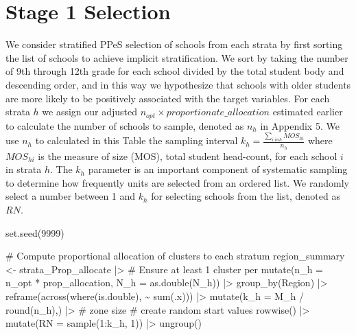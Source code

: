 \documentclass[
  12pt]{article}
\newenvironment{Shaded}{\begin{snugshade}}{\end{snugshade}}
\newcommand{\AttributeTok}[1]{\textcolor[rgb]{0.40,0.45,0.13}{#1}}
\newcommand{\CommentTok}[1]{\textcolor[rgb]{0.37,0.37,0.37}{#1}}
\newcommand{\DecValTok}[1]{\textcolor[rgb]{0.68,0.00,0.00}{#1}}
\newcommand{\FunctionTok}[1]{\textcolor[rgb]{0.28,0.35,0.67}{#1}}
\newcommand{\NormalTok}[1]{\textcolor[rgb]{0.00,0.23,0.31}{#1}}
\newcommand{\OtherTok}[1]{\textcolor[rgb]{0.00,0.23,0.31}{#1}}
\newcommand{\SpecialCharTok}[1]{\textcolor[rgb]{0.37,0.37,0.37}{#1}}
\begin{document}
\section{Stage 1 Selection}\label{stage-1-selection}

We consider stratified PPeS selection of schools from each strata by
first sorting the list of schools to achieve implicit stratification. We
sort by taking the number of 9th through 12th grade for each school
divided by the total student body and descending order, and in this way
we hypothesize that schools with older students are more likely to be
positively associated with the target variables. For each strata \(h\)
we assign our adjusted \(n_{opt} \times proportionate \_ allocation\)
estimated earlier to calculate the number of schools to sample, denoted
as \(n_h\) in Appendix 5. We use \(n_h\) to calculated in this Table the
sampling interval \(k_h = \frac{\sum_{i \ in h} MOS_{hi}}{n_h}\) where
\(MOS_{hi}\) is the measure of size (MOS), total student head-count, for
each school \(i\) in strata \(h\). The \(k_h\) parameter is an important
component of systematic sampling to determine how frequently units are
selected from an ordered list. We randomly select a number between 1 and
\(k_h\) for selecting schools from the list, denoted as \(RN\).

\begin{Shaded}
\begin{Highlighting}[]
\FunctionTok{set.seed}\NormalTok{(}\DecValTok{9999}\NormalTok{) }

\CommentTok{\# Compute proportional allocation of clusters to each stratum}
\NormalTok{region\_summary }\OtherTok{\textless{}{-}}\NormalTok{ strata\_Prop\_allocate }\SpecialCharTok{|\textgreater{}} 
  \CommentTok{\# Ensure at least 1 cluster per}
  \FunctionTok{mutate}\NormalTok{(}\AttributeTok{n\_h =}\NormalTok{ n\_opt }\SpecialCharTok{*}\NormalTok{ prop\_allocation,}
                     \AttributeTok{N\_h =} \FunctionTok{as.double}\NormalTok{(N\_h)) }\SpecialCharTok{|\textgreater{}} 
  \FunctionTok{group\_by}\NormalTok{(Region) }\SpecialCharTok{|\textgreater{}} 
  \FunctionTok{reframe}\NormalTok{(}\FunctionTok{across}\NormalTok{(}\FunctionTok{where}\NormalTok{(is.double), }\SpecialCharTok{\textasciitilde{}} \FunctionTok{sum}\NormalTok{(.x))) }\SpecialCharTok{|\textgreater{}} 
  \FunctionTok{mutate}\NormalTok{(}\AttributeTok{k\_h =}\NormalTok{ M\_h }\SpecialCharTok{/} \FunctionTok{round}\NormalTok{(n\_h),) }\SpecialCharTok{|\textgreater{}}    \CommentTok{\# zone size}
  \CommentTok{\# create random start values}
  \FunctionTok{rowwise}\NormalTok{() }\SpecialCharTok{|\textgreater{}} 
  \FunctionTok{mutate}\NormalTok{(}\AttributeTok{RN =} \FunctionTok{sample}\NormalTok{(}\DecValTok{1}\SpecialCharTok{:}\NormalTok{k\_h, }\DecValTok{1}\NormalTok{)) }\SpecialCharTok{|\textgreater{}} 
  \FunctionTok{ungroup}\NormalTok{() }
\end{Highlighting}
\end{Shaded}
\end{document}
